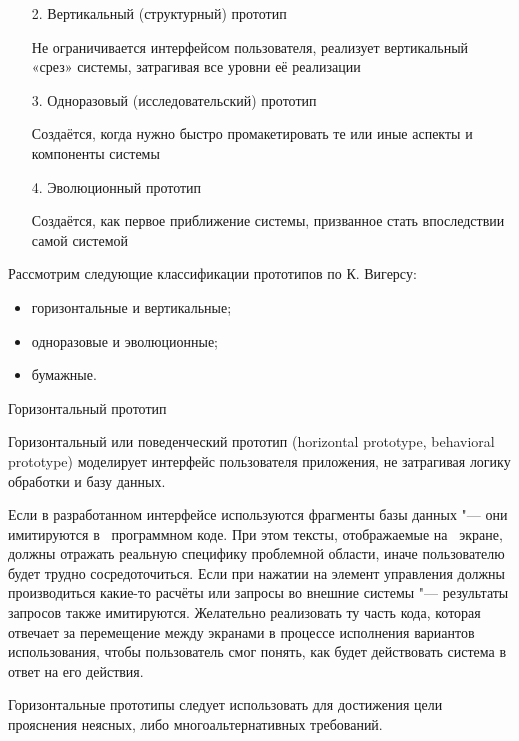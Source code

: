 \documentclass{../industrial-development}
\begin{document}
{\begin{frame}
\begin{itemize}
{\small Моделирует интерфейс пользователя приложения, не~затрагивая логику обработки и базу данных}


\item[2.] Вертикальный (структурный) прототип

{\small Не ограничивается интерфейсом пользователя, реализует вертикальный «срез» системы, затрагивая все уровни её реализации}

\item[3.] Одноразовый (исследовательский) прототип

{\small Создаётся, когда нужно быстро промакетировать те или иные аспекты и компоненты системы}

\item[4.] Эволюционный прототип

{\small Создаётся, как первое приближение системы, призванное стать впоследствии самой системой}


\end{itemize}
\end{frame}

\lecturenotes

Рассмотрим следующие классификации прототипов по К. Вигерсу:

\begin{itemize}
\item горизонтальные и вертикальные;
\item одноразовые и эволюционные;
\item бумажные.
\end{itemize}

\alert{Горизонтальный прототип}

Горизонтальный или поведенческий прототип (horizontal prototype, behavioral prototype) моделирует интерфейс пользователя приложения, не затрагивая логику обработки и базу данных.

Если в разработанном интерфейсе используются фрагменты базы данных "--- они имитируются в~ программном коде. При этом тексты, отображаемые на~ экране, должны отражать реальную специфику проблемной области, иначе пользователю будет трудно сосредоточиться. Если при нажатии на элемент управления должны производиться какие-то расчёты или запросы во внешние системы "--- результаты запросов также имитируются. Желательно реализовать ту часть кода, которая отвечает за перемещение между экранами в процессе исполнения вариантов использования, чтобы пользователь смог понять, как будет действовать система в ответ на его действия.

Горизонтальные прототипы следует использовать для достижения цели прояснения неясных, либо многоальтернативных требований.

}
\end{document}
